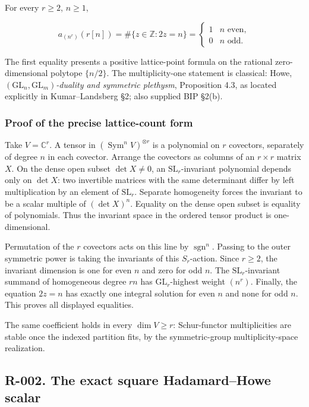 \documentclass[
  10pt,
]{article}
\begin{document}
For every \(r\ge2\), \(n\ge1\),

\[
a_{(n^r)}(r[n])
=\#\{z\in\mathbb Z:2z=n\}
=\begin{cases}1&n\text{ even},\\0&n\text{ odd}.\end{cases}
\tag{R-001}
\]

The first equality presents a positive lattice-point formula on the
rational zero-dimensional polytope \(\{n/2\}\). The multiplicity-one
statement is classical: Howe,
\emph{\((\mathrm{GL}_n,\mathrm{GL}_m)\)-duality and symmetric plethysm},
Proposition 4.3, as located explicitly in Kumar--Landsberg §2; also
supplied BIP §2(b).

\subsubsection{Proof of the precise lattice-count
form}\label{proof-of-the-precise-lattice-count-form}

Take \(V=\mathbb C^r\). A tensor in
\((\operatorname{Sym}^nV)^{\otimes r}\) is a polynomial on \(r\)
covectors, separately of degree \(n\) in each covector. Arrange the
covectors as columns of an \(r\times r\) matrix \(X\). On the dense open
subset \(\det X\ne0\), an \(\mathrm{SL}_r\)-invariant polynomial depends
only on \(\det X\): two invertible matrices with the same determinant
differ by left multiplication by an element of \(\mathrm{SL}_r\).
Separate homogeneity forces the invariant to be a scalar multiple of
\((\det X)^n\). Equality on the dense open subset is equality of
polynomials. Thus the invariant space in the ordered tensor product is
one-dimensional.

Permutation of the \(r\) covectors acts on this line by
\(\operatorname{sgn}^n\). Passing to the outer symmetric power is taking
the invariants of this \(S_r\)-action. Since \(r\ge2\), the invariant
dimension is one for even \(n\) and zero for odd \(n\). The
\(\mathrm{SL}_r\)-invariant summand of homogeneous degree \(rn\) has
\(\mathrm{GL}_r\)-highest weight \((n^r)\). Finally, the equation
\(2z=n\) has exactly one integral solution for even \(n\) and none for
odd \(n\). This proves all displayed equalities.

The same coefficient holds in every \(\dim V\ge r\): Schur-functor
multiplicities are stable once the indexed partition fits, by the
symmetric-group multiplicity-space realization.

\subsection{R-002. The exact square Hadamard--Howe
scalar}\label{r-002.-the-exact-square-hadamardhowe-scalar}
\end{document}

